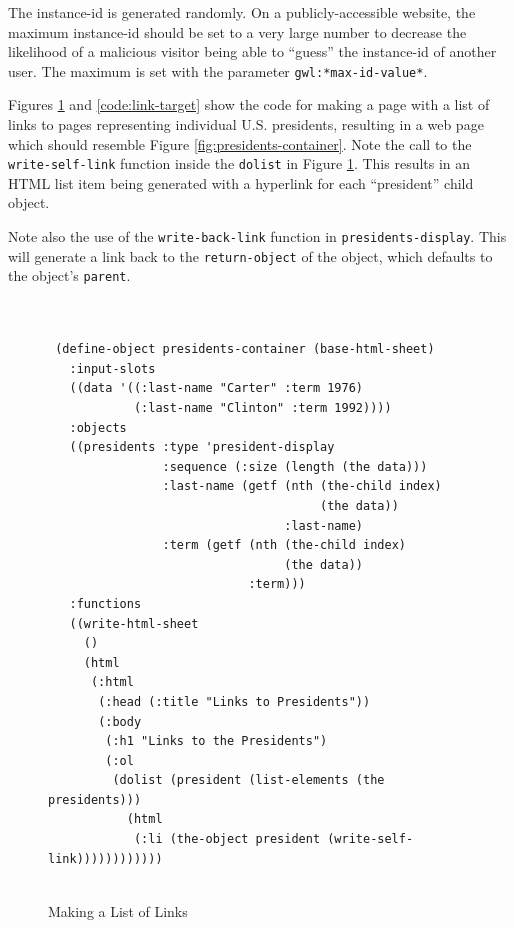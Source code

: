 \documentclass [11pt]{book}
\begin{document}
The instance-id is generated randomly. On a publicly-accessible website,
the maximum instance-id should be set to a very large number to decrease
the likelihood of a malicious visitor being able to ``guess'' the 
instance-id of another user. The maximum is set with the parameter \texttt{gwl:*max-id-value*}. 

Figures 
\ref{code:page-linking} and 
\ref{code:link-target} show the code for making a page with a list of links
to pages representing individual U.S. presidents, resulting in a 
web page which should resemble Figure 
\ref{fig:presidents-container}. Note the call
to the \texttt{write-self-link} function inside the \texttt{dolist} in Figure 
\ref{code:page-linking}. This results in an HTML list item being generated with a hyperlink
for each ``president'' child object.

Note also the use of the \texttt{write-back-link} function in \texttt{presidents-display}. This will generate a link back to the \texttt{return-object} of the object, which defaults to the object's \texttt{parent}.
\begin{figure}
\begin{lrbox}{\boxedverb}
\begin{minipage}{\linewidth}

\begin{verbatim}


 (define-object presidents-container (base-html-sheet)
   :input-slots
   ((data '((:last-name "Carter" :term 1976)
            (:last-name "Clinton" :term 1992))))
   :objects
   ((presidents :type 'president-display
                :sequence (:size (length (the data)))
                :last-name (getf (nth (the-child index)
                                      (the data))
                                 :last-name)
                :term (getf (nth (the-child index)
                                 (the data))
                            :term)))
   :functions
   ((write-html-sheet 
     ()
     (html
      (:html
       (:head (:title "Links to Presidents"))
       (:body
        (:h1 "Links to the Presidents")
        (:ol
         (dolist (president (list-elements (the presidents)))
           (html
            (:li (the-object president (write-self-link))))))))))))
 
\end{verbatim}
\end{minipage}
\end{lrbox}
\fbox{\usebox{\boxedverb}}

\caption{Making a List of Links}

\label{code:page-linking}

\end{figure}
\end{document}
